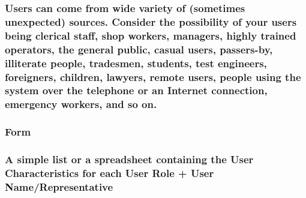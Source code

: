 \documentclass[
]{article}
\begin{document}
\hypertarget{users-can-come-from-wide-variety-of-sometimes-unexpected-sources.-consider-the-possibility-of-your-users-being-clerical-staff-shop-workers-managers-highly-trained-operators-the-general-public-casual-users-passers-by-illiterate-people-tradesmen-students-test-engineers-foreigners-children-lawyers-remote-users-people-using-the-system-over-the-telephone-or-an-internet-connection-emergency-workers-and-so-on.}{%
\subsubsection{\texorpdfstring{Users can come from wide variety of
(sometimes unexpected) sources. Consider the possibility of your users
being clerical staff, shop workers, managers, highly trained operators,
the general public, casual users, passers-by, illiterate people,
tradesmen, students, test engineers, foreigners, children, lawyers,
remote users, people using the system over the telephone or an Internet
connection, emergency workers, and so on.
}{Users can come from wide variety of (sometimes unexpected) sources. Consider the possibility of your users being clerical staff, shop workers, managers, highly trained operators, the general public, casual users, passers-by, illiterate people, tradesmen, students, test engineers, foreigners, children, lawyers, remote users, people using the system over the telephone or an Internet connection, emergency workers, and so on. }}\label{users-can-come-from-wide-variety-of-sometimes-unexpected-sources.-consider-the-possibility-of-your-users-being-clerical-staff-shop-workers-managers-highly-trained-operators-the-general-public-casual-users-passers-by-illiterate-people-tradesmen-students-test-engineers-foreigners-children-lawyers-remote-users-people-using-the-system-over-the-telephone-or-an-internet-connection-emergency-workers-and-so-on.}}

\hypertarget{form-5}{%
\subsubsection{Form}\label{form-5}}

\hypertarget{a-simple-list-or-a-spreadsheet-containing-the-user-characteristics-for-each-user-role-user-namerepresentative}{%
\subsubsection{A simple list or a spreadsheet containing the User
Characteristics for each User Role + User
Name/Representative}\label{a-simple-list-or-a-spreadsheet-containing-the-user-characteristics-for-each-user-role-user-namerepresentative}}
\end{document}
